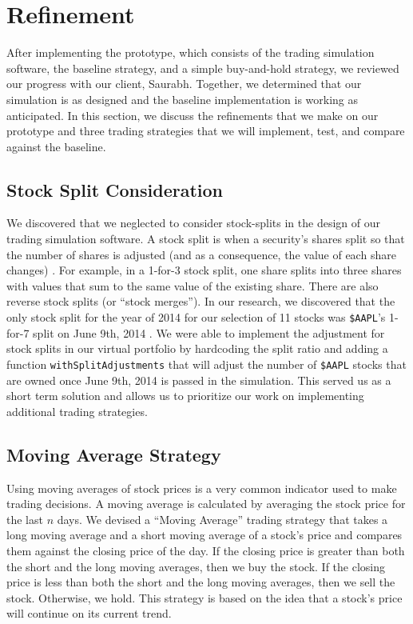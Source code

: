 
\section{Refinement}

After implementing the prototype, which consists of the trading simulation software, the baseline strategy, and a simple buy-and-hold strategy, we reviewed our progress with our client, Saurabh.
Together, we determined that our simulation is as designed and the baseline implementation is working as anticipated.
In this section, we discuss the refinements that we make on our prototype and three trading strategies that we will implement, test, and compare against the baseline.

\subsection{Stock Split Consideration}

We discovered that we neglected to consider stock-splits in the design of our trading simulation software.
A stock split is when a security's shares split so that the number of shares is adjusted (and as a consequence, the value of each share changes) \cite{stocksplit}.
For example, in a 1-for-3 stock split, one share splits into three shares with values that sum to the same value of the existing share.
There are also reverse stock splits (or ``stock merges'').
In our research, we discovered that the only stock split for the year of 2014 for our selection of 11 stocks was \texttt{\$AAPL}'s 1-for-7 split on June 9th, 2014 \cite{appleSplit}.
We were able to implement the adjustment for stock splits in our virtual portfolio by hardcoding the split ratio and adding a function \texttt{withSplitAdjustments} that will adjust the number of \texttt{\$AAPL} stocks that are owned once June 9th, 2014 is passed in the simulation.
This served us as a short term solution and allows us to prioritize our work on implementing additional trading strategies.

\subsection{Moving Average Strategy}

Using moving averages of stock prices is a very common indicator used to make trading decisions.
A moving average is calculated by averaging the stock price for the last $n$ days.
We devised a ``Moving Average'' trading strategy that takes a long moving average and a short moving average of a stock's price and compares them against the closing price of the day.
If the closing price is greater than both the short and the long moving averages, then we buy the stock.
If the closing price is less than both the short and the long moving averages, then we sell the stock.
Otherwise, we hold.
This strategy is based on the idea that a stock's price will continue on its current trend.

